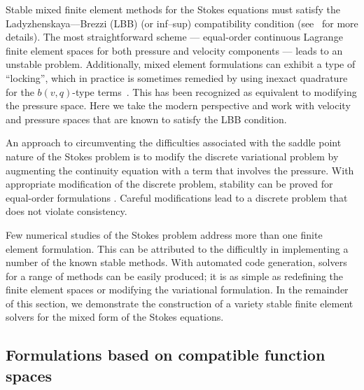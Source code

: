 Stable mixed finite element methods for the Stokes equations must satisfy the
Ladyzhenskaya--\babuska--Brezzi (LBB) (or inf--sup) compatibility condition
(see~\citet{BrezziFortin1991} for more details).  The most straightforward
scheme --- equal-order continuous Lagrange finite element spaces for both
pressure and velocity components --- leads to an unstable problem.
Additionally, mixed element formulations can exhibit a type of ``locking'',
which in practice is sometimes remedied by using inexact quadrature for the
$b(v, q)$-type terms~\citep{EngelmanSaniGreshoBercovier1982}.  This has been
recognized as equivalent to modifying the pressure space.  Here we take the
modern perspective and work with velocity and pressure spaces that are known to
satisfy the LBB condition.

An approach to circumventing the difficulties associated with the
saddle point nature of the Stokes problem is to modify the discrete
variational problem by augmenting the continuity equation with a
term that involves the pressure. With appropriate modification of the
discrete problem, stability can be proved for equal-order formulations
\citep{HughesFrancaBalestra1986}.  Careful modifications lead to a
discrete problem that does not violate consistency.

Few numerical studies of the Stokes problem address more than one
finite element formulation. This can be attributed to the difficultly
in implementing a number of the known stable methods. With automated
code generation, solvers for a range of methods can be easily produced;
it is as simple as redefining the finite element spaces or modifying
the variational formulation.  In the remainder of this section, we
demonstrate the construction of a variety stable finite element solvers
for the mixed form of the Stokes equations.

\subsection{Formulations based on compatible function spaces}

